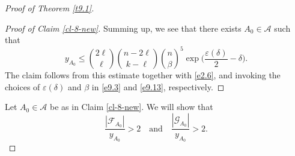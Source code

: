 \documentclass[10pt,a4paper]{amsart}
\theoremstyle{remark}
\newcommand{\mik}{\leqslant}
\newcommand{\Fcal}{\mathcal{F}}
\newcommand{\Gcal}{\mathcal{G}}
\newcommand{\Acal}{\mathcal{A}}
\begin{document}
\begin{proof}[Proof of Theorem \emph{\ref{t9.1}}]
\begin{proof}[Proof of Claim \emph{\ref{cl-8-new}}]
Summing up, we see that there exists $A_0\in\Acal$ such that
\begin{equation} \label{en9.10}
y_{A_0}\mik \binom{2\ell}{\ell}\binom{n-2\ell}{k-\ell} \binom{n}{\beta}^5
\exp\Big(\frac{\varepsilon(\delta)}{2}-\delta\Big).
\end{equation}
The claim follows from this estimate together with \eqref{e2.6}, and invoking the choices of
$\varepsilon(\delta)$ and $\beta$ in \eqref{e9.3} and \eqref{e9.13}, respectively.
\end{proof}
Let $A_0\in\mathcal{A}$ be as in Claim \ref{cl-8-new}. We will show that
%
\begin{equation} \label{e9.17}
\frac{|\Fcal_{A_0}|}{y_{A_0}}>2 \ \ \ \text{ and } \ \ \ \frac{|\Gcal_{A_0}|}{y_{A_0}}>2.
\end{equation}

\end{proof}
\end{document}
